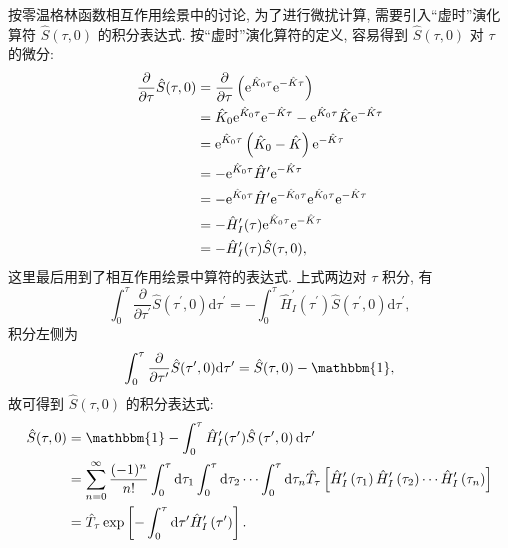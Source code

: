 按零温格林函数相互作用绘景中的讨论, 为了进行微扰计算, 需要引入“虚时”演化算符 $\hat{S}(\tau, 0)$ 的积分表达式. 按“虚时”演化算符的定义, 容易得到 $\hat{S}(\tau, 0)$ 对 $\tau$ 的微分:
\begin{align}
\frac{\partial}{\partial \tau} \hat{S}(\tau, 0) & =\frac{\partial}{\partial \tau}\left(\mathrm{e}^{\hat{K}_0 \tau} \mathrm{e}^{-\hat{K} \tau}\right)\nonumber\\
&=\hat{K}_0 \mathrm{e}^{\hat{K}_0 \tau} \mathrm{e}^{-\hat{K} \tau}-\mathrm{e}^{\hat{K}_0 \tau} \hat{K} \mathrm{e}^{-\hat{K} \tau} \nonumber\\
& =\mathrm{e}^{\hat{K}_0 \tau}\left(\hat{K}_0-\hat{K}\right) \mathrm{e}^{-\hat{K} \tau}\nonumber\\
&=-\mathrm{e}^{\hat{K}_0 \tau} \hat{H}^{\prime} \mathrm{e}^{-\hat{K} \tau} \nonumber\\
& =-\mathrm{e}^{\hat{K}_0 \tau} \hat{H}^{\prime} \mathrm{e}^{-\hat{K}_0 \tau} \mathrm{e}^{\hat{K}_0 \tau} \mathrm{e}^{-\hat{K} \tau}\nonumber\\
&=-\hat{H}_I^{\prime}(\tau) \mathrm{e}^{\hat{K}_0 \tau} \mathrm{e}^{-\hat{K} \tau}\nonumber \\
& =-\hat{H}_I^{\prime}(\tau) \hat{S}(\tau, 0),
\end{align}
这里最后用到了相互作用绘景中算符的表达式. 上式两边对 $\tau$ 积分, 有
\begin{equation}
\int_0^\tau \frac{\partial}{\partial \tau^\prime}\hat{S}(\tau^\prime, 0)\mathrm{d} \tau^\prime=-\int_0^\tau \hat{H}_I^{\prime}(\tau^\prime) \hat{S}(\tau^\prime, 0)\mathrm{d} \tau^\prime,
\end{equation}
积分左侧为
\begin{equation}
\int_0^\tau \frac{\partial}{\partial \tau^\prime}\hat{S}(\tau^\prime, 0)\mathrm{d} \tau^\prime=\hat{S}(\tau, 0)-\mathbbm{1},
\end{equation}
故可得到 $\hat{S}(\tau, 0)$ 的积分表达式:
\begin{align}
\hat{S}(\tau, 0) & =\mathbbm{1}-\int_0^\tau \hat{H}_I^{\prime}(\tau^{\prime}) \hat{S}\left(\tau^{\prime}, 0\right) \mathrm{d} \tau^{\prime}\nonumber \\
& =\sum_{n=0}^{\infty} \frac{(-1)^n}{n !} \int_0^\tau \mathrm{d} \tau_1 \int_0^\tau \mathrm{d} \tau_2 \cdots \int_0^\tau \mathrm{d} \tau_n \hat{T}_\tau\left[\hat{H}_I^{\prime}\left(\tau_1\right) \hat{H}_I^{\prime}\left(\tau_2\right) \cdots \hat{H}_I^{\prime}\left(\tau_n\right)\right] \nonumber\\
& =\hat{T}_\tau \exp \left[-\int_0^\tau \mathrm{d} \tau' \hat{H}_I^{\prime}\left(\tau^{\prime}\right)\right] .
\end{align}


